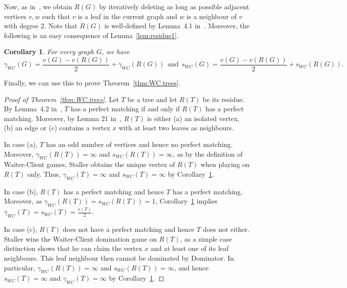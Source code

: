 \documentclass[reqno, 12pt]{amsart}
\numberwithin{equation}{section}
\numberwithin{figure}{section}
\newtheorem{corollary}[theorem]{Corollary}
\begin{document}
\smallskip

Now, as in~\cite{gledel2019maker},
we obtain $R(G)$ by iteratively deleting as long as possible
adjacent vertices $v,w$ such that
$v$ is a leaf in the current graph
and $w$ is a neighbour of $v$ with degree $2$.
Note that $R(G)$ is well-defined by Lemma~4.1
in~\cite{gledel2019maker}. Moreover,
the following is an easy consequence of Lemma~\ref{lem:residue1}.

\begin{corollary}\label{cor:residue2}
For every graph $G$, we have 
$$\gamma_{WC}(G) = \frac{v(G)-v(R(G))}{2} + \gamma_{WC}(R(G))
~~ \text{and} ~~
s_{WC}(G) = \frac{v(G)-v(R(G))}{2} + s_{WC}(R(G))
.$$
\end{corollary}
    
Finally, we can use this to prove Theorem~\ref{thm:WC.trees}.

\begin{proof}[Proof of Theorem~\ref{thm:WC.trees}]
Let $T$ be a tree and let $R(T)$ be its residue.
By Lemma~4.2 in~\cite{gledel2019maker}, $T$ has a perfect matching if and only if
$R(T)$ has a perfect matching. Moreover, by Lemma 21
in~\cite{duchene2020maker},
$R(T)$ is either (a) an isolated vertex, (b) an edge or (c) contains a vertex $x$ with at least two leaves as neighbours.

In case (a), $T$ has an odd number of vertices and hence no perfect matching. Moreover, $\gamma_{WC}(R(T))=\infty$ and $s_{WC}(R(T))=\infty$,
as by the definition of Waiter-Client games,
Staller obtains the unique vertex of $R(T)$ when playing on $R(T)$ only. Thus, $\gamma_{WC}(T)=\infty$ 
and $s_{WC}(T)=\infty$ by Corollary~\ref{cor:residue2}.

In case (b), $R(T)$ has a perfect matching
and hence $T$ has a perfect matching. Moreover, as 
$\gamma_{WC}(R(T))=s_{WC}(R(T))=1$, Corollary~\ref{cor:residue2} implies $\gamma_{WC}(T) = s_{WC}(T) = \frac{v(T)}{2}$.

In case (c), $R(T)$ does not have a perfect matching
and hence $T$ does not either. Staller wins the Waiter-Client domination game on $R(T)$, as a simple case distinction shows that he can claim
the vertex $x$ and at least one of its leaf neighbours.
This leaf neighbour then cannot be dominated by Dominator.
In particular, $\gamma_{WC}(R(T))=\infty$ and $s_{WC}(R(T))=\infty$, and hence
$s_{WC}(T)=\infty$ and $\gamma_{WC}(T)=\infty$ by Corollary~\ref{cor:residue2}.
\end{proof}
\end{document}
